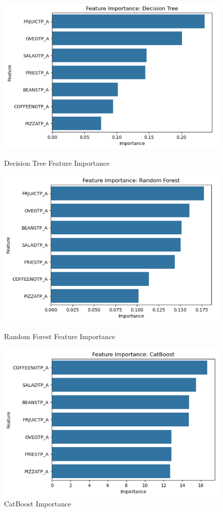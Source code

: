 \documentclass{article}
\begin{document}
\begin{figure}[h!]
	\centering
	\begin{minipage}{0.32\textwidth}
		\centering
		\includegraphics[width=0.9\linewidth]{../Image/P20.jpg}
		\caption{Decision Tree Feature Importance}
		\label{fig:P20}
	\end{minipage}\hfill
	\begin{minipage}{0.32\textwidth}
		\centering
		\includegraphics[width=0.9\linewidth]{../Image/P21.jpg}
		\caption{Random Forest Feature Importance}
		\label{fig:P21}
	\end{minipage}\hfill
	\begin{minipage}{0.32\textwidth}
		\centering
		\includegraphics[width=0.9\linewidth]{../Image/P22.jpg}
		\caption{CatBoost Importance}
		\label{fig:P22}
	\end{minipage}
\end{figure}
\end{document}

